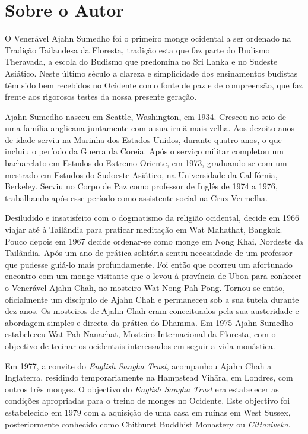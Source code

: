 \chapter{Sobre o Autor}

O Venerável Ajahn Sumedho foi o primeiro monge ocidental a ser ordenado na 
Tradição Tailandesa da Floresta, tradição esta que faz parte do Budismo Theravada, 
a escola do Budismo que predomina no Sri Lanka e no Sudeste Asiático.
Neste último século a clareza e simplicidade dos ensinamentos budistas têm sido
bem recebidos no Ocidente como fonte de paz e de compreensão, que faz frente
aos rigorosos testes da nossa presente geração.

Ajahn Sumedho nasceu em Seattle, Washington, em 1934. Cresceu no seio de uma
família anglicana juntamente com a sua irmã mais velha. Aos dezoito anos de idade
serviu na Marinha dos Estados Unidos, durante quatro anos, o que incluiu o
período da Guerra da Coreia. Após o serviço militar completou um bacharelato em
Estudos do Extremo Oriente, em 1973, graduando-se com um mestrado em Estudos do
Sudoeste Asiático, na Universidade da Califórnia, Berkeley. Serviu no Corpo de
Paz como professor de Inglês de 1974 a 1976, trabalhando após esse período como
assistente social na Cruz Vermelha.

Desiludido e insatisfeito com o dogmatismo da religião ocidental, decide em 1966
viajar até à Tailândia para praticar meditação em Wat Mahathat, Bangkok. Pouco
depois em 1967 decide ordenar-se como monge em Nong Khai, Nordeste da Tailândia.
Após um ano de prática solitária sentiu necessidade de um professor que pudesse
guiá-lo mais profundamente. Foi então que ocorreu um afortunado encontro com um
monge visitante que o levou à província de Ubon para conhecer o Venerável Ajahn
Chah, no mosteiro Wat Nong Pah Pong. Tornou-se então, oficialmente um discípulo
de Ajahn Chah e permaneceu sob a sua tutela durante dez anos. Os mosteiros de
Ajahn Chah eram conceituados pela sua austeridade e abordagem simples e directa
da prática do Dhamma. Em 1975 Ajahn Sumedho estabeleceu Wat Pah Nanachat,
Mosteiro Internacional da Floresta, com o objectivo de treinar os ocidentais
interessados em seguir a vida monástica.

Em 1977, a convite do \emph{English Sangha Trust}, acompanhou Ajahn Chah a
Inglaterra, residindo temporariamente na Hampstead Vihāra, em Londres, com
outros três monges. O objectivo do \emph{English Sangha Trust} era estabelecer
as condições apropriadas para o treino de monges no Ocidente. Este objectivo foi
estabelecido em 1979 com a aquisição de uma casa em ruínas em West Sussex,
posteriormente conhecido como Chithurst Buddhist Monastery ou
\emph{Cittaviveka}.

